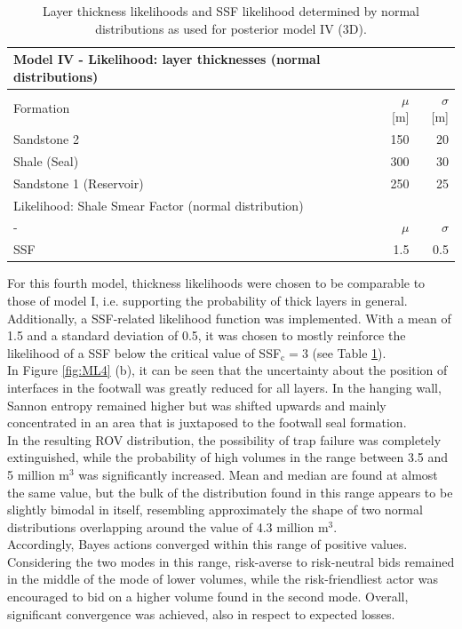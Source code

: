 		\begin{table}[h]
			\centering
			\begin{tabular}{lrr} 
				\toprule
				Model IV - Likelihood: layer thicknesses (normal distributions)\\  
				\midrule 
				Formation & $\mu$ [m] & $\sigma$ [m]\\ 
				\midrule 
				Sandstone 2 & 150 & 20 \\
				Shale (Seal) & 300 & 30\\ 
				Sandstone 1 (Reservoir) & 250 & 25 \\
				\bottomrule
				\toprule
				Likelihood: Shale Smear Factor (normal distribution)\\
				\midrule
				- & $\mu$ & $\sigma$\\
				\midrule
				SSF & 1.5 & 0.5\\
				\bottomrule
			\end{tabular}
			\caption{Layer thickness likelihoods and SSF likelihood determined by normal distributions as used for posterior model IV (3D).}
			\label{tab:ML4_likelihoods}
		\end{table}
		For this fourth model, thickness likelihoods were chosen to be comparable to those of model I, i.e. supporting the probability of thick layers in general. Additionally, a SSF-related likelihood function was implemented. With a mean of 1.5 and a standard deviation of 0.5, it was chosen to mostly reinforce the likelihood of a SSF below the critical value of SSF$_\text{c} = 3$ (see Table \ref{tab:ML4_likelihoods}).\\
		In Figure \ref{fig:ML4} (b), it can be seen that the uncertainty about the position of interfaces in the footwall was greatly reduced for all layers. In the hanging wall, Sannon entropy remained higher but was shifted upwards and mainly concentrated in an area that is juxtaposed to the footwall seal formation.\\
		In the resulting ROV distribution, the possibility of trap failure was completely extinguished, while the probability of high volumes in the range between 3.5  and 5 million m$^3$ was significantly increased. Mean and median are found at almost the same value, but the bulk of the distribution found in this range appears to be slightly bimodal in itself, resembling approximately the shape of two normal distributions overlapping around the value of 4.3 million m$^3$.\\
		Accordingly, Bayes actions converged within this range of positive values. Considering the two modes in this range, risk-averse to risk-neutral bids remained in the middle of the mode of lower volumes, while the risk-friendliest actor was encouraged to bid on a higher volume found in the second mode. Overall, significant convergence was achieved, also in respect to expected losses.\\		

